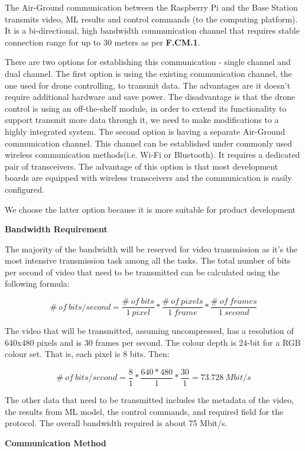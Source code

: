 The Air-Ground communication between the Raspberry Pi and the Base Station transmits video, ML results and control commands (to the computing platform). It is a bi-directional, high bandwidth communication channel that requires stable connection range for up to 30 meters as per \textbf{F.CM.1}.

There are two options for establishing this communication - single channel and dual channel. The first option is using the existing communication channel, the one used for drone controlling, to transmit data. The advantages are it doesn't require additional hardware and save power. The disadvantage is that the drone control is using an off-the-shelf module, in order to extend its functionality to support transmit more data through it, we need to make modifications to a highly integrated system. The second option is having a separate Air-Ground communication channel. This channel can be established under commonly used wireless communication methods(i.e. Wi-Fi or Bluetooth). It requires a dedicated pair of transceivers. The advantage of this option is that most development boards are equipped with wireless transceivers and the communication is easily configured.

We choose the latter option because it is more suitable for product development

\textbf{Bandwidth Requirement}

The majority of the bandwidth will be reserved for video transmission as it's the most intensive transmission task among all the tasks. The total number of bits per second of video that need to be transmitted can be calculated using the following formula:

\[ \#\:of\:bits/second = \dfrac{\#\:of\:bits}{1\:pixel} * \dfrac{\#\:of\:pixels}{1\:frame} * \dfrac{\#\:of\:frames}{1\:second} \]

The video that will be transmitted, assuming uncompressed, has a resolution of 640x480 pixels and is 30 frames per second. The colour depth is 24-bit for a RGB colour set. That is, each pixel is 8 bits. Then:

\[ \#\:of\:bits/second = \dfrac{8}{1} * \dfrac{640*480}{1} * \dfrac{30}{1} = 73.728\:Mbit/s \]

The other data that need to be transmitted includes the metadata of the video, the results from ML model, the control commands, and required field for the protocol. The overall bandwidth required is about 75 Mbit/s.

\textbf{Communication Method}

